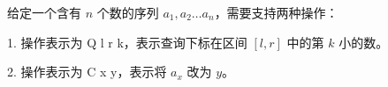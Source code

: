 
给定一个含有 $n$ 个数的序列 $a_1, a_2 \ldots a_n$，需要支持两种操作：

1. 操作表示为 Q l r k，表示查询下标在区间 $[l, r]$ 中的第 $k$ 小的数。

2. 操作表示为 C x y，表示将 $a_x$ 改为 $y$。